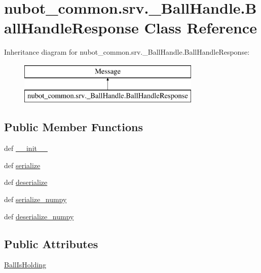 \hypertarget{classnubot__common_1_1srv_1_1__BallHandle_1_1BallHandleResponse}{\section{nubot\-\_\-common.\-srv.\-\_\-\-Ball\-Handle.\-Ball\-Handle\-Response Class Reference}
\label{classnubot__common_1_1srv_1_1__BallHandle_1_1BallHandleResponse}
}
Inheritance diagram for nubot\-\_\-common.\-srv.\-\_\-\-Ball\-Handle.\-Ball\-Handle\-Response\-:\begin{figure}[H]
\begin{center}
\leavevmode
\includegraphics[height=2.000000cm]{classnubot__common_1_1srv_1_1__BallHandle_1_1BallHandleResponse}
\end{center}
\end{figure}
\subsection*{Public Member Functions}
\begin{DoxyCompactItemize}
\item 
def \hyperlink{classnubot__common_1_1srv_1_1__BallHandle_1_1BallHandleResponse_a9299e86c7061cea345bab3b328bca09d}{\-\_\-\-\_\-init\-\_\-\-\_\-}
\item 
def \hyperlink{classnubot__common_1_1srv_1_1__BallHandle_1_1BallHandleResponse_a36fd7eefb3bb7a89e7b8513651402bc7}{serialize}
\item 
def \hyperlink{classnubot__common_1_1srv_1_1__BallHandle_1_1BallHandleResponse_a006fab5d3f634e8504d0c99803db818b}{deserialize}
\item 
def \hyperlink{classnubot__common_1_1srv_1_1__BallHandle_1_1BallHandleResponse_ac7f68ddb086586c8e9ca621d14074922}{serialize\-\_\-numpy}
\item 
def \hyperlink{classnubot__common_1_1srv_1_1__BallHandle_1_1BallHandleResponse_a3e84ba76011f99de1385ccf104e08f15}{deserialize\-\_\-numpy}
\end{DoxyCompactItemize}
\subsection*{Public Attributes}
\begin{DoxyCompactItemize}
\item 
\hyperlink{classnubot__common_1_1srv_1_1__BallHandle_1_1BallHandleResponse_aa45498032f4d3d83a565db954a4a8edc}{Ball\-Is\-Holding}
\end{DoxyCompactItemize}

